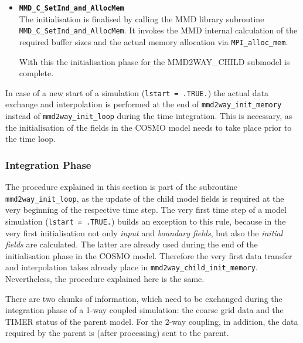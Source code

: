 \documentclass[11pt,twoside]{article}
\begin{document}
\begin{itemize}
\item {\tt \bf MMD\_C\_SetInd\_and\_AllocMem\\}
The initialisation is finalised by calling the MMD library subroutine 
\verb|MMD_C_SetInd_and_AllocMem|. It invokes the MMD internal 
calculation of the required buffer sizes and the actual memory allocation
via \verb|MPI_alloc_mem|.

With this the initialisation phase for the MMD2WAY\_CHILD submodel is complete.
\end{itemize} %

In case of a new start of a simulation (\verb|lstart = .TRUE.|) the
actual data exchange and interpolation is performed at the end
of \verb|mmd2way_init_memory| instead of \verb|mmd2way_init_loop|
during the time integration. This is necessary, as the initialisation
of the fields in the COSMO model needs to take place prior to the time
loop.


\subsubsection{Integration Phase}
The procedure explained in this section is part of the subroutine
\verb|mmd2way_init_loop|, as the update of the child model fields is
required at the very  
beginning of the respective time step. The very first time step of a model 
simulation (\verb|lstart = .TRUE.|) builds an exception to this rule, because
in the very first initialisation not only {\it input} and {\it boundary fields},
 but also the {\it initial fields} are calculated. 
The latter are already used during the 
end of the initialisation phase in the COSMO model. Therefore the very first 
data transfer and interpolation takes already place in 
\verb|mmd2way_child_init_memory|. 
Nevertheless, the procedure explained here is the same.

There are two chunks of information, which need to be exchanged during the
integration phase of a 1-way coupled simulation: the coarse grid data
and the TIMER status of the parent model. For the 2-way coupling, in
addition, the data required by the parent is (after processing)
sent to the parent.
\end{document}
